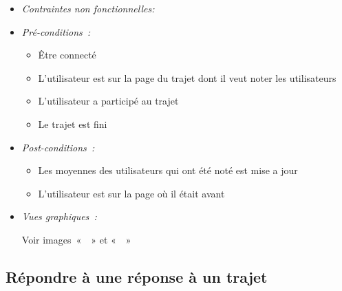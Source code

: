 \begin{itemize}
\item \textit{Contraintes non fonctionnelles:}

\item \textit{Pré-conditions~:}

    \begin{itemize}
        \item Être connecté
        \item L'utilisateur est sur la page du trajet dont il veut noter les utilisateurs
        \item L'utilisateur a participé au trajet
        \item Le trajet est fini
    \end{itemize}

\item \textit{Post-conditions~:}
    \begin{itemize}
        \item Les moyennes des utilisateurs qui ont été noté est mise a jour
        \item L'utilisateur est sur la page où il était avant
    \end{itemize}
    
\item \textit{Vues graphiques~:}
    
    Voir images~«~~» et 
«~~»

\end{itemize}

\subsection{Répondre à une réponse à un trajet}\label{subsec:accepter-reponse-trajet}

